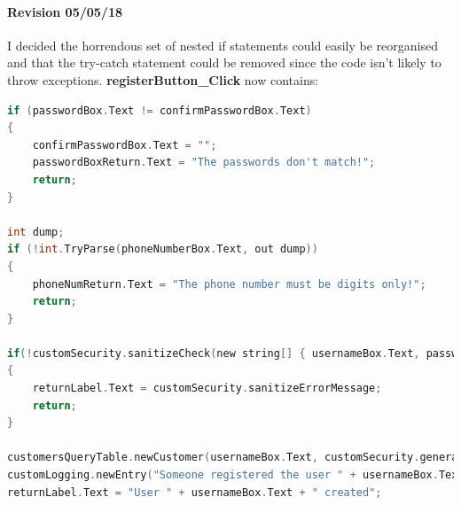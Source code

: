 ﻿\documentclass{article}
\begin{document}
    \paragraph{Revision 05/05/18}
    I decided the horrendous set of nested if statements could easily be reorganised and that the try-catch statement could be removed since the code isn't likely to throw exceptions.
    \textbf{registerButton\_Click} now contains:
    \begin{lstlisting}[language=C]
if (passwordBox.Text != confirmPasswordBox.Text)
{
    confirmPasswordBox.Text = "";
    passwordBoxReturn.Text = "The passwords don't match!";
    return;
}

int dump;
if (!int.TryParse(phoneNumberBox.Text, out dump))
{
    phoneNumReturn.Text = "The phone number must be digits only!";
    return;
}

if(!customSecurity.sanitizeCheck(new string[] { usernameBox.Text, passwordBox.Text, address1Box.Text, address2Box.Text, cityBox.Text, countryDropdown.SelectedValue, postcodeBox.Text, phoneNumberBox.Text, forenameBox.Text, surnameBox.Text }))
{
    returnLabel.Text = customSecurity.sanitizeErrorMessage;
    return;
}

customersQueryTable.newCustomer(usernameBox.Text, customSecurity.generateMD5(passwordBox.Text), address1Box.Text, address2Box.Text, cityBox.Text, countryDropdown.SelectedValue, postcodeBox.Text, phoneNumberBox.Text, forenameBox.Text, surnameBox.Text);
customLogging.newEntry("Someone registered the user " + usernameBox.Text);
returnLabel.Text = "User " + usernameBox.Text + " created";
    \end{lstlisting}
    \newpage
\end{document}
